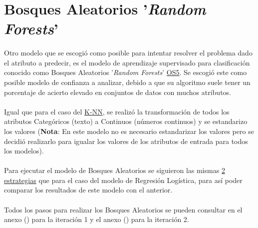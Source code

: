 \section{Bosques Aleatorios '\textit{Random Forests}'}
\label{section:rf}

\paragraph{}
Otro modelo que se escogió como posible para intentar resolver el problema dado el atributo a predecir, es el modelo de aprendizaje supervisado para clasificación conocido como Bosques Aleatorios '\textit{Random Forests}'\cite{ref:rf_def} \hyperref[os:OS5]{OS5}. Se escogió este como posible modelo de confianza a analizar, debido a que su algoritmo suele tener un porcentaje de acierto elevado en conjuntos de datos con muchos atributos.

\paragraph{}
Igual que para el caso del \hyperref[section:knn]{K-NN}, se realizó la transformación de todos los atributos Categóricos (texto) a Continuos (números continuos) y se estandarizo los valores (\textbf{Nota}: En este modelo no es necesario estandarizar los valores pero se decidió realizarlo para igualar los valores de los atributos de entrada para todos los modelos).

\paragraph{}
Para ejecutar el modelo de Bosques Aleatorios se siguieron las mismas \hyperref[section:lr_casos]{2 estrategias} que para el caso del modelo de Regresión Logística, para así poder comparar los resultados de este modelo con el anterior.

\paragraph{}
Todos los pasos para realizar los Bosques Aleatorios se pueden consultar en el anexo () para la iteración 1 y el anexo () para la iteración 2.
